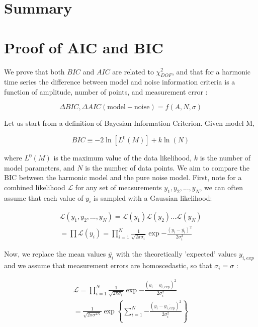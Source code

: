 \documentclass[fleqn,usenatbib]{mnras}  %
\begin{document}
\section{Summary}

\appendix
\section{Proof of AIC and BIC }

We prove that both $BIC$ and $AIC$ are related to $\chi^{2}_{DOF}$, and that for a harmonic time series the difference between model and noise information criteria is a function of amplitude, number of points, and measurement error : 

\begin{equation}
{\Delta BIC, \Delta AIC}(\mathrm{model} - \mathrm{noise}) = f(A, N, \sigma)
\end{equation}

Let us start from a definition of Bayesian Information Criterion. Given model M, 

\begin{equation}
\label{eq:BIC_eq}
BIC \equiv -2 \ln [L^{0}(M)] + k \ln(N)
\end{equation}


where $L^{0}(M)$ is the maximum value of the data likelihood, $k$ is the number of model parameters, and $N$ is the number of data points.  We aim to compare the BIC between the harmonic model and the pure noise model.  First,  note for a combined likelihood $\mathcal{L}$ for any set of measurements ${y_{1},y_{2},...,y_{N}}$, we can often assume that each value of $y_{i}$ is sampled with a Gaussian likelihood:

\begin{multline}
\mathcal{L}(y_{1},y_{2},...,y_{N}) = \mathcal{L}(y_{1})  \mathcal{L}(y_{2})  ... \mathcal{L}(y_{N})  \\ 
=   \prod{\mathcal{L}(y_{i})} = 
\prod_{i=1}^{N}{\frac{1}{\sqrt{2\pi \sigma_{i}}} \exp{-\frac{\left( y_{i} - \bar{y_{i}} \right)^{2} }{2 \sigma_{i}^{2}}  }  }
\end{multline}



Now, we replace the mean values $\bar{y_{i}}$  with the theoretically 
'expected' values $y_{i,exp}$  and we assume that measurement errors are homoscedastic, so that $\sigma_{i} = \sigma$ : 

\begin{multline}
\mathcal{L} = \prod_{i=1}^{N}{\frac{1}{\sqrt{2\pi \sigma_{i}}} \exp{-\frac{\left( y_{i} - \bar{y_{i,exp}} \right)^{2} }{2 \sigma_{i}^{2}}  }  } \\
= \frac{1}{\sqrt{2 \pi \sigma^{2N}}}  \exp{ \left\{ \sum_{i=1}^{N}{-\frac{\left( y_{i} - \bar{y_{i,exp}} \right)^{2} }  {2 \sigma_{i}^{2}}  }  \right\} }
\end{multline}
\end{document}
